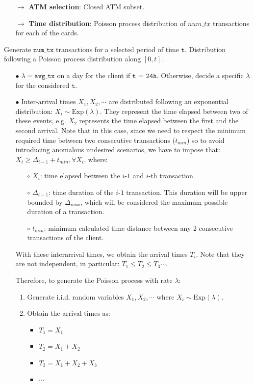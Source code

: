 \documentclass{article}
\begin{document}
\begin{tcolorbox}
  \begin{itemize}
    \item[$\rightarrow$] \textbf{ATM selection}: Closed ATM subset.
    \item[$\rightarrow$] \textbf{Time distribution}: Poisson process distribution of $num\_tx$ 
    transactions for each of the cards.
  \end{itemize}
\end{tcolorbox}

Generate $\texttt{num\_tx}$ transactions for a selected period of time $\texttt{t}$.
Distribution following a Poisson process distribution along $[0,t]$.
\begin{itemize}
    \item[$\bullet$] $\lambda=\texttt{avg\_tx}$ on a day for the client if $\texttt{t = 24h}$. Otherwise, 
    decide a specific $\lambda$ for the considered $\texttt{t}$.
    \item[$\bullet$] Inter-arrival times $X_1, X_2, \cdots$ are distributed following an exponential distribution:
    $X_i \sim \text{Exp}(\lambda)$. They represent the time elapsed between two of these events, e.g. $X_2$ represents the time elapsed between the first and the second arrival. Note that in this case, since we need to respect the minimum required time between two consecutive 
    transactions ($t_{min}$) so to avoid introducing anomalous undesired scenarios, we have to impose
    that: $X_i \geq \Delta_{i-1} + t_{min}, \forall X_i$, where:

    \begin{itemize}
      \item[$\circ$] $X_{i}$: time elapsed between the $i$-$1$ and $i$-th transaction.
      \item[$\circ$] $\Delta_{i-1}$: time duration of the $i$-$1$ transaction. This duration will 
      be upper bounded by $\Delta_{max}$, which will be considered the maximum possible duration of a transaction.
      \item[$\circ$] $t_{min}$: minimum calculated time distance between any 2 consecutive transactions of the client.
  \end{itemize}

    With these interarrival times, we obtain the arrival times $T_i$. Note that they are not independent, in particular:
    $T_1 \leq T_2 \leq T_3 \cdots$.

    Therefore, to generate the Poisson process with rate $\lambda$:
    \begin{enumerate}
      \item Generate i.i.d. random variables $X_1, X_2, \cdots$ where $X_i \sim \text{Exp}(\lambda)$.
      \item Obtain the arrival times as:
        \begin{itemize}
          \item $T_1 = X_1$
          \item $T_2 = X_1 + X_2$
          \item $T_3 = X_1 + X_2 + X_3$
          \item $\cdots$
        \end{itemize}
    \end{enumerate}


\end{itemize}
\end{document}
